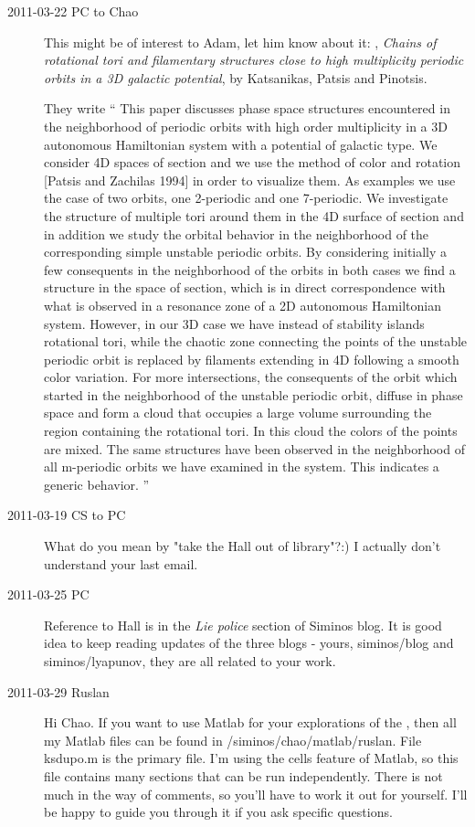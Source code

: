 \begin{description}
\item[2011-03-22 PC to Chao]
This might be of interest to Adam, let him know about it:
,
\emph{Chains of rotational tori and filamentary structures close to high
 multiplicity periodic orbits in a 3D galactic potential},
 by Katsanikas, Patsis and Pinotsis.

They write
``
This paper discusses phase space structures encountered in the neighborhood of periodic orbits with high order multiplicity in a 3D autonomous Hamiltonian system with a potential of galactic type. We consider 4D spaces of section and we use the method of color and rotation [Patsis and Zachilas 1994] in order to visualize them. As examples we use the case of two orbits, one 2-periodic and one 7-periodic. We investigate the structure of multiple tori around them in the 4D surface of section and in addition we study the orbital behavior in the neighborhood of the corresponding simple unstable periodic orbits. By considering initially a few consequents in the neighborhood of the orbits in both cases we find a structure in the space of section, which is in direct correspondence with what is observed in a resonance zone of a 2D autonomous Hamiltonian system. However, in our 3D case we have instead of stability islands rotational tori, while the chaotic zone connecting the points of the unstable periodic orbit is replaced by filaments extending in 4D following a smooth color variation. For more intersections, the consequents of the orbit which started in the neighborhood of the unstable periodic orbit, diffuse in phase space and form a cloud that occupies a large volume surrounding the region containing the rotational tori. In this cloud the colors of the points are mixed. The same structures have been observed in the neighborhood of all m-periodic orbits we have examined in the system. This indicates a generic behavior.
''

\item[2011-03-19 CS to PC]
What do you mean by "take the Hall out of library"?:) I actually don't understand your last email.

\item[2011-03-25 PC]
Reference to Hall is in the {\em Lie police} section of Siminos
blog. It is good idea to keep reading updates of the three blogs - yours,
siminos/blog and siminos/lyapunov, they are all related to your work.

\item[2011-03-29 Ruslan]
Hi Chao.  If you want to use Matlab for your explorations of the \KS, then all my Matlab files can be found in /siminos/chao/matlab/ruslan.  File ksdupo.m is the primary file.  I'm using the cells feature of Matlab, so this file contains many sections that can be run independently.  There is not much in the way of comments, so you'll have to work it out for yourself.  I'll be happy to guide you through it if you ask specific questions.


\end{description}
